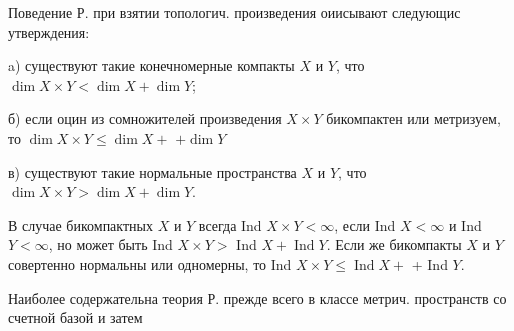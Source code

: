 \documentclass[10pt]{article}
\begin{document}
Поведение Р. при взятии топологич. произведения оиисывают следующис утверждения:



a) существуют такие конечномерные компакты $X$ и $Y$, что $\operatorname{dim} X \times Y<\operatorname{dim} X+\operatorname{dim} Y$;



б) если оцин из сомножителей произведения $X \times Y$ бикомпактен или метризуем, то $\operatorname{dim} X \times Y \leqslant \operatorname{dim} X+$ $+\operatorname{dim} Y$



в) существуют такие нормальные пространства $X$ и $Y$, что $\operatorname{dim} X \times Y>\operatorname{dim} X+\operatorname{dim} Y$.



В случае бикомпактных $X$ и $Y$ всегда Ind $X \times Y<\infty$, если Ind $X<\infty$ и Ind $Y<\infty$, но может быть Ind $X \times Y>$ Ind $X+\operatorname{Ind} Y$. Если же бикомпакты $X$ и $Y$ совертенно нормальны или одномерны, то Ind $X \times Y \leqslant \operatorname{Ind} X+$ + Ind $Y$.



Наиболее содержательна теория Р. прежде всего в классе метрич. пространств со счетной базой и затем
\end{document}
